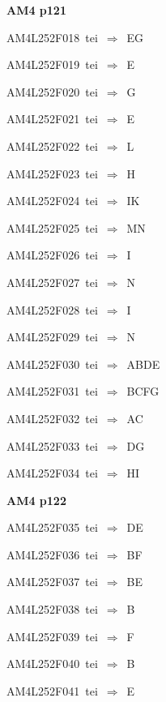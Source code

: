 \par\vfill\eject
{\bf\hfill AM4 p121\hfill\hbox{}}\par\bigskip
{\sixrm AM4L252F018\ {\sixit tei}\ }$\Rightarrow$\ EG\par\smallskip
{\sixrm AM4L252F019\ {\sixit tei}\ }$\Rightarrow$\ E\par\smallskip
{\sixrm AM4L252F020\ {\sixit tei}\ }$\Rightarrow$\ G\par\smallskip
{\sixrm AM4L252F021\ {\sixit tei}\ }$\Rightarrow$\ E\par\smallskip
{\sixrm AM4L252F022\ {\sixit tei}\ }$\Rightarrow$\ L\par\smallskip
{\sixrm AM4L252F023\ {\sixit tei}\ }$\Rightarrow$\ H\par\smallskip
{\sixrm AM4L252F024\ {\sixit tei}\ }$\Rightarrow$\ IK\par\smallskip
{\sixrm AM4L252F025\ {\sixit tei}\ }$\Rightarrow$\ MN\par\smallskip
{\sixrm AM4L252F026\ {\sixit tei}\ }$\Rightarrow$\ I\par\smallskip
{\sixrm AM4L252F027\ {\sixit tei}\ }$\Rightarrow$\ N\par\smallskip
{\sixrm AM4L252F028\ {\sixit tei}\ }$\Rightarrow$\ I\par\smallskip
{\sixrm AM4L252F029\ {\sixit tei}\ }$\Rightarrow$\ N\par\smallskip
{\sixrm AM4L252F030\ {\sixit tei}\ }$\Rightarrow$\ ABDE\par\smallskip
{\sixrm AM4L252F031\ {\sixit tei}\ }$\Rightarrow$\ BCFG\par\smallskip
{\sixrm AM4L252F032\ {\sixit tei}\ }$\Rightarrow$\ AC\par\smallskip
{\sixrm AM4L252F033\ {\sixit tei}\ }$\Rightarrow$\ DG\par\smallskip
{\sixrm AM4L252F034\ {\sixit tei}\ }$\Rightarrow$\ HI\par\smallskip

\par\vfill\eject
{\bf\hfill AM4 p122\hfill\hbox{}}\par\bigskip
{\sixrm AM4L252F035\ {\sixit tei}\ }$\Rightarrow$\ DE\par\smallskip
{\sixrm AM4L252F036\ {\sixit tei}\ }$\Rightarrow$\ BF\par\smallskip
{\sixrm AM4L252F037\ {\sixit tei}\ }$\Rightarrow$\ BE\par\smallskip
{\sixrm AM4L252F038\ {\sixit tei}\ }$\Rightarrow$\ B\par\smallskip
{\sixrm AM4L252F039\ {\sixit tei}\ }$\Rightarrow$\ F\par\smallskip
{\sixrm AM4L252F040\ {\sixit tei}\ }$\Rightarrow$\ B\par\smallskip
{\sixrm AM4L252F041\ {\sixit tei}\ }$\Rightarrow$\ E\par\smallskip

